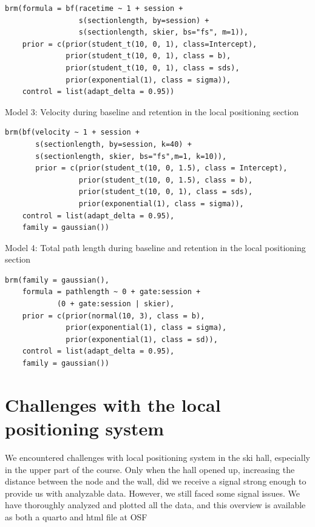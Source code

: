 \documentclass{article}
\begin{document}
\begin{verbatim}
brm(formula = bf(racetime ~ 1 + session + 
                 s(sectionlength, by=session) +
                 s(sectionlength, skier, bs="fs", m=1)),
    prior = c(prior(student_t(10, 0, 1), class=Intercept),
              prior(student_t(10, 0, 1), class = b),
              prior(student_t(10, 0, 1), class = sds),
              prior(exponential(1), class = sigma)),
    control = list(adapt_delta = 0.95))
\end{verbatim}

Model 3: Velocity during baseline and retention in the local positioning section

\begin{verbatim}
brm(bf(velocity ~ 1 + session + 
       s(sectionlength, by=session, k=40) +
       s(sectionlength, skier, bs="fs",m=1, k=10)), 
       prior = c(prior(student_t(10, 0, 1.5), class = Intercept),
                 prior(student_t(10, 0, 1.5), class = b),
                 prior(student_t(10, 0, 1), class = sds),
                 prior(exponential(1), class = sigma)),
    control = list(adapt_delta = 0.95),
    family = gaussian())
\end{verbatim}

Model 4: Total path length during baseline and retention in the local positioning section

\begin{verbatim}
brm(family = gaussian(),
    formula = pathlength ~ 0 + gate:session + 
            (0 + gate:session | skier),
    prior = c(prior(normal(10, 3), class = b), 
              prior(exponential(1), class = sigma),
              prior(exponential(1), class = sd)),
    control = list(adapt_delta = 0.95),
    family = gaussian())
\end{verbatim}

\section{Challenges with the local positioning system} \label{appendixd}
We encountered challenges with local positioning system in the ski hall, especially in the upper part of the course. Only when the hall opened up, increasing the distance between the node and the wall, did we receive a signal strong enough to provide us with analyzable data. However, we still faced some signal issues. We have thoroughly analyzed and plotted all the data, and this overview is available as both a quarto and html file at OSF  
\end{document}
